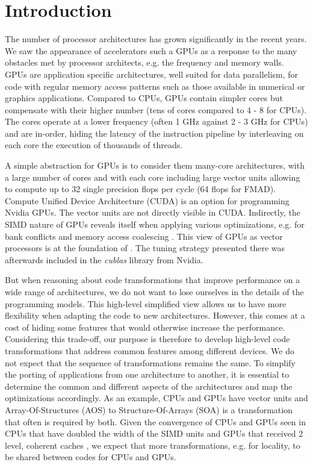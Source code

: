 \section{Introduction}
The number of processor architectures has grown significantly in the recent
years. We saw the appearance of accelerators such a GPUs as a response to the
many obstacles met by processor architects, e.g. the frequency and memory walls.
GPUs are application specific architectures, well suited for data parallelism,
for code with regular memory access patterns such as those available in
numerical or graphics applications. Compared to CPUs, GPUs contain simpler cores
but compensate with their higher number (tens of cores compared to 4 - 8 for
CPUs). The cores operate at a lower frequency (often 1 GHz against 2 - 3 GHz for
CPUs) and are in-order, hiding the latency of the instruction pipeline by
interleaving on each core the execution of thousands of threads.

A simple abstraction for GPUs is to consider them many-core architectures, with
a large number of cores and with each core including large vector units
allowing to compute up to 32 single precision flops per cycle (64 flops for
FMAD). Compute Unified Device Architecture (CUDA) is an option for programming
Nvidia GPUs. The vector units are not directly visible in CUDA. Indirectly, the
SIMD nature of GPUs reveals itself when applying various optimizations, e.g. for
bank conflicts and memory access coalescing \cite{cuda}. This view of GPUs as
vector processors is at the foundation of
\cite{Volkov:2008:BGT:1413370.1413402}. The tuning strategy presented there was
afterwards included in the \textit{cublas} library from Nvidia.

But when reasoning about code transformations that improve performance on a wide
range of architectures, we do not want to lose ourselves in the details of the
programming models. This high-level simplified view allows us to have more
flexibility when adapting the code to new architectures. However, this comes at
a cost of hiding some features that would otherwise increase the performance.
Considering this trade-off, our purpose is therefore to develop high-level code
transformations that address common features among different devices. We do not
expect that the sequence of transformations remains the same. To simplify the
porting of applications from one architecture to another, it is essential to
determine the common and different aspects of the architectures and map the
optimizations accordingly. As an example, CPUs and GPUs have vector units and
Array-Of-Structures (AOS) to Structure-Of-Arrays (SOA) is a transformation that
often is required by both. Given the convergence of CPUs and GPUs seen in CPUs
that have doubled the width of the SIMD units and GPUs that received 2 level,
coherent caches \cite{fermi}, we expect that more transformations, e.g. for
locality, to be shared between codes for CPUs and GPUs.

